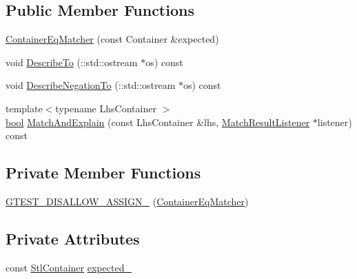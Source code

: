\subsection*{Public Member Functions}
\begin{DoxyCompactItemize}
\item 
\hyperlink{classtesting_1_1internal_1_1ContainerEqMatcher_ad9a4c224c92176d57a865191f419802f}{Container\+Eq\+Matcher} (const Container \&expected)
\item 
void \hyperlink{classtesting_1_1internal_1_1ContainerEqMatcher_a28ace6da475d05134916eb50e54baf1e}{Describe\+To} (\+::std\+::ostream $\ast$os) const
\item 
void \hyperlink{classtesting_1_1internal_1_1ContainerEqMatcher_a3dc9e61b6aff65039325138dccccb8ec}{Describe\+Negation\+To} (\+::std\+::ostream $\ast$os) const
\item 
{\footnotesize template$<$typename Lhs\+Container $>$ }\\\hyperlink{classbool}{bool} \hyperlink{classtesting_1_1internal_1_1ContainerEqMatcher_a348c6139776dd7d713d100e406ee38f4}{Match\+And\+Explain} (const Lhs\+Container \&lhs, \hyperlink{classtesting_1_1MatchResultListener}{Match\+Result\+Listener} $\ast$listener) const
\end{DoxyCompactItemize}
\subsection*{Private Member Functions}
\begin{DoxyCompactItemize}
\item 
\hyperlink{classtesting_1_1internal_1_1ContainerEqMatcher_a5d18bc67e3e53b3c3cfa416100262014}{G\+T\+E\+S\+T\+\_\+\+D\+I\+S\+A\+L\+L\+O\+W\+\_\+\+A\+S\+S\+I\+G\+N\+\_\+} (\hyperlink{classtesting_1_1internal_1_1ContainerEqMatcher}{Container\+Eq\+Matcher})
\end{DoxyCompactItemize}
\subsection*{Private Attributes}
\begin{DoxyCompactItemize}
\item 
const \hyperlink{classtesting_1_1internal_1_1ContainerEqMatcher_a8352d0190c372578d9a9a8457e0810db}{Stl\+Container} \hyperlink{classtesting_1_1internal_1_1ContainerEqMatcher_ab5d9ad6869dc59908a4b1c72fde78d31}{expected\+\_\+}
\end{DoxyCompactItemize}


